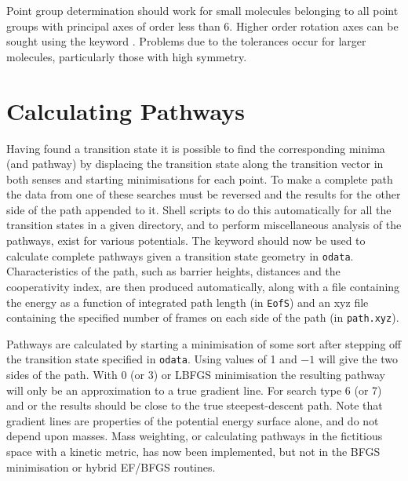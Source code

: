 {{{Point group determination should work for small molecules belonging to all point groups with 
principal axes of order less than 6. Higher order rotation axes can be sought using the
keyword {}. Problems due to the tolerances occur for larger molecules,
particularly those with high symmetry. 

\section{Calculating Pathways}
\label{sec:pathways}
Having found a transition state it is possible to
find the corresponding minima (and pathway) by displacing the transition state along
the transition vector in both senses and starting minimisations for each point. To make
a complete path the data from one of these searches must be reversed and the results
for the other side of the path appended to it. Shell scripts to do this automatically
for all the transition states in a given directory, and to perform miscellaneous analysis
of the pathways, exist for various potentials. The  keyword should now be
used to calculate complete pathways given a transition state geometry in {\tt odata}.
Characteristics of the path, such as barrier heights, distances and the cooperativity index,
are then produced automatically, along with a file containing the energy as a function
of integrated path length (in {\tt EofS}) and an xyz file containing the specified number
of frames on each side of the path (in {\tt path.xyz}).

Pathways are calculated by starting a minimisation of some sort after stepping off the
transition state specified in {\tt odata}.
Using {} values of 1 and $-1$ will give the two sides of the path.
With  0 (or 3) or LBFGS minimisation 
the resulting pathway will only be an approximation to a true
gradient line. For search type 6 (or 7) and {} or {} 
the results should be close to the true steepest-descent
path. Note that gradient lines are properties of the potential energy surface alone, and
do not depend upon masses. Mass weighting, or calculating pathways in the fictitious
space with a kinetic metric,\cite{banerjeea92} has now been implemented, but not in the BFGS
minimisation or hybrid EF/BFGS routines.

}}}
